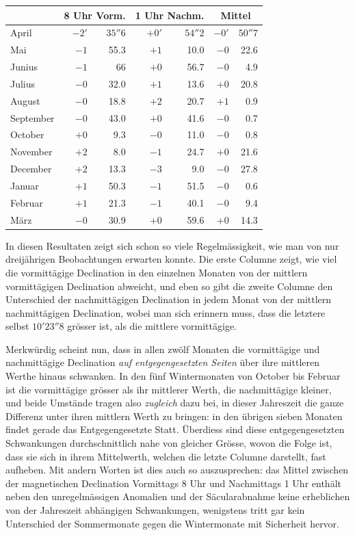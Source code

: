 \begin{center}\small
\begin{tabular}{l|rr|rr||rr}
&\multicolumn{2}{c|}{8 Uhr Vorm.}&\multicolumn{2}{c||}{1 Uhr Nachm.}&\multicolumn{2}{c}{Mittel}\\\hline
April&$-2'$&$35''6$&$+0'$&$54''2$&$-0'$&$50''7$\\
Mai&$-1$&55.3&$+1$&10.0&$-0$&22.6\\
Junius&$-1$&6\phantom{.}6&$+0$&56.7&$-0$&4.9\\
Julius&$-0$&32.0&$+1$&13.6&$+0$&20.8\\
August&$-0$&18.8&$+2$&20.7&$+1$&0.9\\
September&$-0$&43.0&$+0$&41.6&$-0$&0.7\\
October&$+0$&9.3&$-0$&11.0&$-0$&0.8\\
November&$+2$&8.0&$-1$&24.7&$+0$&21.6\\
December&$+2$&13.3&$-3$&9.0&$-0$&27.8\\
Januar&$+1$&50.3&$-1$&51.5&$-0$&0.6\\
Februar&$+1$&21.3&$-1$&40.1&$-0$&9.4\\
März&$-0$&30.9&$+0$&59.6&$+0$&14.3
\end{tabular}
\end{center}
In diesen Resultaten zeigt sich schon so viele Regelmässigkeit, wie man von nur dreijährigen Beobachtungen erwarten konnte. Die erste Columne zeigt, wie viel die vormittägige Declination in den einzelnen Monaten von der mittlern vormittägigen Declination abweicht, und eben so gibt die zweite Columne den Unterschied der nachmittägigen Declination in jedem Monat von der mittlern nachmittägigen Declination, wobei man sich erinnern muss, dass die letztere selbst $10'23''8$ grösser ist, als die mittlere vormittägige.

Merkwürdig scheint nun, dass in allen zwölf Monaten die vormittägige und nachmittägige Declination \textit{auf entgegengesetzten Seiten} über ihre mittleren Werthe hinaus schwanken. In den fünf Wintermonaten von October bis Februar ist die vormittägige grösser als ihr mittlerer Werth, die nachmittägige kleiner, und beide Umstände tragen also \textit{zugleich} dazu bei, in dieser Jahreszeit die ganze Differenz unter ihren mittlern Werth zu bringen: in den übrigen sieben Monaten findet gerade das Entgegengesetzte Statt. Überdiess sind diese entgegengesetzten Schwankungen durchschnittlich nahe von gleicher Grösse, wovon die Folge ist, dass sie sich in ihrem Mittelwerth, welchen die letzte Columne darstellt, fast aufheben. Mit andern Worten ist dies auch so auszusprechen: das Mittel zwischen der magnetischen Declination Vormittags 8 Uhr und Nachmittags 1 Uhr
enthält neben den unregelmässigen Anomalien und der Säcularabnahme keine erheblichen von der Jahreszeit abhängigen Schwankungen, wenigstens tritt gar kein Unterschied der Sommermonate gegen die Wintermonate mit Sicherheit hervor.

